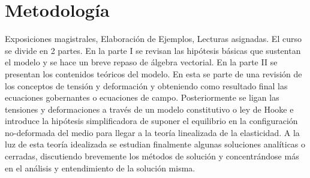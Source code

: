\section*{Metodología}
%
Exposiciones magistrales, Elaboración de Ejemplos, Lecturas asignadas. El curso se divide en 2 partes.  En la parte I se revisan las hipótesis básicas que sustentan el modelo y se hace un breve repaso de álgebra vectorial. En la parte II se presentan los contenidos teóricos del modelo. En esta se parte de una revisión de los conceptos de tensión y deformación y obteniendo como resultado final las ecuaciones gobernantes o ecuaciones de campo.  Posteriormente se ligan las tensiones y deformaciones a través de un modelo constitutivo o ley de Hooke e introduce la hipótesis simplificadora de suponer el equilibrio en la configuración no-deformada del medio para llegar a la teoría linealizada de la elasticidad.  A la luz de esta teoría idealizada se estudian finalmente algunas soluciones analíticas o cerradas, discutiendo brevemente los métodos de solución y concentrándose más en el análisis y entendimiento de la solución misma.


